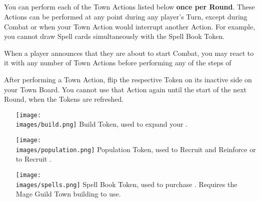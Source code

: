 \begin{multicols}{2}
\subsection*{}
You can perform each of the Town Actions listed below \textbf{once per Round}.
These Actions can be performed at any point during any player's Turn, except during Combat or when your Town Action would interrupt another Action.
For example, you cannot draw Spell cards simultaneously with the Spell Book Token.\par
When a player announces that they are about to start Combat, you may react to it with any number of Town Actions before performing any of the steps of \par
After performing a Town Action, flip the respective Token on its inactive side on your Town Board.
You cannot use that Action again until the start of the next Round, when the Tokens are refreshed.
\begin{itemize}
  \item [{\texttt{[image: \\images/build.png]}}] Build Token, used to expand your .
  \item [{\texttt{[image: \\images/population.png]}}] Population Token, used to Recruit and Reinforce  or to Recruit .
  \item [{\texttt{[image: \\images/spells.png]}}]Spell Book Token, used to purchase . Requires the Mage Guild Town building to use.
\end{itemize}


\end{multicols}
